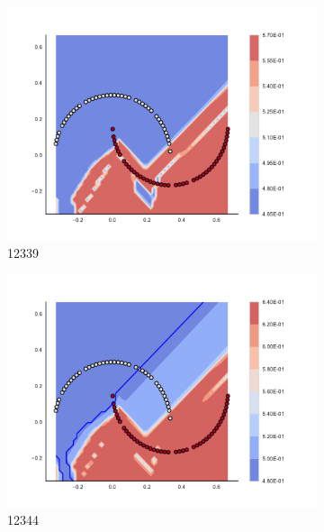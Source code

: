 \begin{figure}[h]
\begin{subfigure}[b]{0.09\textwidth}
    \includegraphics[clip, trim=2.35cm 1.75cm 4.5cm 0cm,width=\textwidth]{img/convergence/12339.pdf}
    \caption{12339}
    \label{fig:convergence_12339}
\end{subfigure}
%
\begin{subfigure}[b]{0.09\textwidth}
    \includegraphics[clip, trim=2.35cm 1.75cm 4.5cm 0cm,width=\textwidth]{img/convergence/12344.pdf}
    \caption{12344}
    \label{fig:convergence_12344}
\end{subfigure}
%
\begin{subfigure}[b]{0.09\textwidth}

\end{subfigure}
\end{figure}
